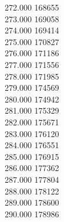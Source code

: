 { 272.000	168655 \\
 273.000	169058 \\
 274.000	169414 \\
 275.000	170827 \\
 276.000	171186 \\
 277.000	171556 \\
 278.000	171985 \\
 279.000	174569 \\
 280.000	174942 \\
 281.000	175329 \\
 282.000	175671 \\
 283.000	176120 \\
 284.000	176551 \\
 285.000	176915 \\
 286.000	177362 \\
 287.000	177804 \\
 288.000	178122 \\
 289.000	178600 \\
 290.000	178986 \\
}
